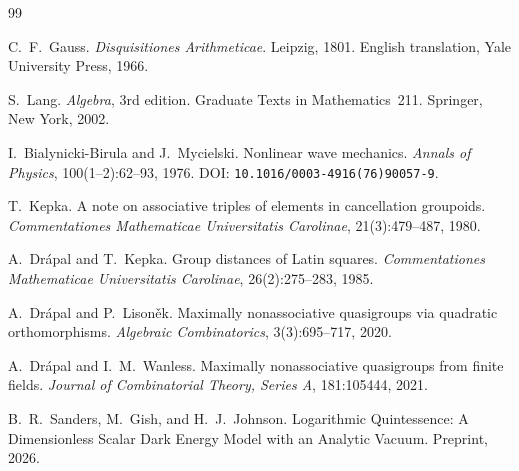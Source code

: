 \documentclass[11pt,reqno]{amsart}
\theoremstyle{plain}
\theoremstyle{definition}
\theoremstyle{remark}
\begin{document}
\begin{thebibliography}{99}

C.~F.~Gauss.
\newblock \emph{Disquisitiones Arithmeticae}.
\newblock Leipzig, 1801.
\newblock English translation, Yale University Press, 1966.

S.~Lang.
\newblock \emph{Algebra}, 3rd edition.
\newblock Graduate Texts in Mathematics~211. Springer, New York, 2002.

I.~Bialynicki-Birula and J.~Mycielski.
\newblock Nonlinear wave mechanics.
\newblock \emph{Annals of Physics}, 100(1--2):62--93, 1976.
\newblock DOI: \texttt{10.1016/0003-4916(76)90057-9}.

T.~Kepka.
\newblock A note on associative triples of elements in cancellation groupoids.
\newblock \emph{Commentationes Mathematicae Universitatis Carolinae},
21(3):479--487, 1980.

A.~Dr\'{a}pal and T.~Kepka.
\newblock Group distances of Latin squares.
\newblock \emph{Commentationes Mathematicae Universitatis Carolinae},
26(2):275--283, 1985.

A.~Dr\'{a}pal and P.~Lison\v{e}k.
\newblock Maximally nonassociative quasigroups via quadratic orthomorphisms.
\newblock \emph{Algebraic Combinatorics}, 3(3):695--717, 2020.

A.~Dr\'{a}pal and I.~M.~Wanless.
\newblock Maximally nonassociative quasigroups from finite fields.
\newblock \emph{Journal of Combinatorial Theory, Series A}, 181:105444, 2021.

B.~R.~Sanders, M.~Gish, and H.~J.~Johnson.
\newblock Logarithmic Quintessence: A Dimensionless Scalar Dark Energy
Model with an Analytic Vacuum.
\newblock Preprint, 2026.

\end{thebibliography}
\end{document}
